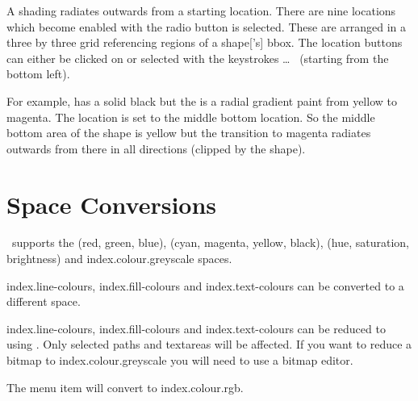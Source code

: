 
A  shading radiates
outwards from a starting location. There are nine locations which
become enabled with the  radio button is
selected. These are arranged in a three by three grid referencing
regions of a \gls*{shape}['s] \gls{bbox}.
The location buttons can either be clicked on or
selected with the keystrokes  \ldots\
 (starting from the bottom left).

For example,  has a solid black
 but the  is a radial
gradient paint from yellow to magenta. The location is set to the
middle bottom location. So the middle bottom area of the \gls{shape}
is yellow but the transition to magenta radiates outwards from there
in all directions (clipped by the shape).


\section{ Space Conversions}\label{sec:convertcolspace}


\FlowframTk\ supports the
 (red, green, blue),
 (cyan, magenta, yellow, black),
\inlineglsdef{index.colour.hsb} (hue, saturation, brightness) and
\gls{index.colour.greyscale} \manmsg{colour} spaces.

\Glspl{index.line-colour}, \glspl{index.fill-colour} and
\glspl{index.text-colour} can be converted to a different
 space.


\Glspl{index.line-colour}, \glspl{index.fill-colour} and
\glspl{index.text-colour} can be reduced to
 using
.  Only selected \glspl{path} and
\glspl{textarea} will be affected. If you want to reduce a
\gls{bitmap} to \gls{index.colour.greyscale} you will need to use a
bitmap editor.


The  menu item will convert to
\gls{index.colour.rgb}.

